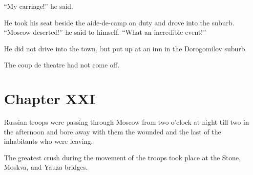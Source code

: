``My carriage!'' he said.

He took his seat beside the aide-de-camp on duty and drove into
the suburb. ``Moscow deserted!'' he said to himself. ``What an
incredible event!''

He did not drive into the town, but put up at an inn in the
Dorogomilov suburb.

The coup de theatre had not come off.


\chapter*{Chapter XXI} \ifaudio {}
\fi

 Russian troops were passing through Moscow from two o'clock
at night till two in the afternoon and bore away with them the
wounded and the last of the inhabitants who were leaving.

The greatest crush during the movement of the troops took place
at the Stone, Moskva, and Yauza bridges.


